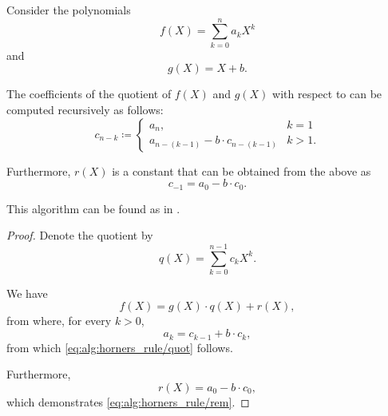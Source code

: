 \begin{algorithm}\label{alg:horners_rule}
  Consider the polynomials
  \begin{equation*}
    f(X) = \sum_{k=0}^n a_k X^k
  \end{equation*}
  and
  \begin{equation*}
    g(X) = X + b.
  \end{equation*}

  The coefficients of the quotient of \( f(X) \) and \( g(X) \) with respect to  can be computed recursively as follows:
  \begin{equation}\label{eq:alg:horners_rule/quot}
    c_{n-k} \coloneqq \begin{cases}
      a_n,                              &k = 1 \\
      a_{n-(k-1)} - b \cdot c_{n-(k-1)} &k > 1.
    \end{cases}
  \end{equation}

  Furthermore, \( r(X) \) is a constant that can be obtained from the above as
  \begin{equation}\label{eq:alg:horners_rule/rem}
    c_{-1} = a_0 - b \cdot c_0.
  \end{equation}
\end{algorithm}
\begin{comments}
  \item This algorithm can be found as  in \cite{notebook:code}.
\end{comments}
\begin{proof}
  Denote the quotient by
  \begin{equation*}
    q(X) = \sum_{k=0}^{n-1} c_k X^k.
  \end{equation*}

  We have
  \begin{equation*}
    f(X) = g(X) \cdot q(X) + r(X),
  \end{equation*}
  from where, for every \( k > 0 \),
  \begin{equation*}
    a_k = c_{k-1} + b \cdot c_k,
  \end{equation*}
  from which \eqref{eq:alg:horners_rule/quot} follows.

  Furthermore,
  \begin{equation*}
    r(X) = a_0 - b \cdot c_0,
  \end{equation*}
  which demonstrates \eqref{eq:alg:horners_rule/rem}.
\end{proof}

